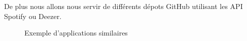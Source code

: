 \documentclass{article}
\begin{document}
								
		De plus nous allons nous servir de différents dépots GitHub utilisant les API Spotify \cite{spotify-web-api} ou Deezer.
								
		\begin{figure}[hb!]
			\centering
			\qquad
			\caption{Exemple d'applications similaires}%
			\label{fig:example}%
		\end{figure}
		\newpage		
\end{document}
